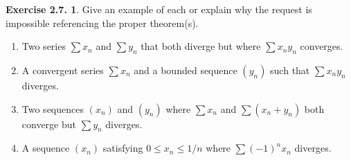 \documentclass[12pt]{article}
\theoremstyle{definition}
\theoremstyle{exercise}
\newtheorem{exercise}{Exercise 2.7.}
\theoremstyle{solution}
\begin{document}
\begin{exercise}
\label{ex:4}
    Give an example of each or explain why the request is impossible referencing the proper theorem(s).
    \begin{enumerate}
        \item Two series \( \sum x_n \) and \( \sum y_n \) that both diverge but where \( \sum x_n y_n \) converges.

        \item A convergent series \( \sum x_n \) and a bounded sequence \( (y_n) \) such that \( \sum x_n y_n \) diverges.

        \item Two sequences \( (x_n) \) and \( (y_n) \) where \( \sum x_n \) and \( \sum (x_n + y_n) \) both converge but \( \sum y_n \) diverges.

        \item A sequence \( (x_n) \) satisfying \( 0 \leq x_n \leq 1/n \) where \( \sum (-1)^n x_n \) diverges.
    \end{enumerate}
\end{exercise}
\end{document}
